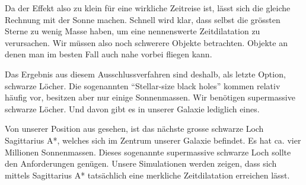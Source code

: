 \begin{refsection}
    Da der Effekt also zu klein für eine wirkliche Zeitreise ist, lässt sich die gleiche Rechnung mit der Sonne machen. Schnell wird klar, dass selbst die grössten Sterne zu wenig Masse haben, um eine nennenswerte Zeitdilatation zu verursachen. Wir müssen also noch schwerere Objekte betrachten. Objekte an denen man im besten Fall auch nahe vorbei fliegen kann. 
     
    Das Ergebnis aus diesem Ausschlussverfahren sind deshalb, als letzte Option, schwarze Löcher. Die sogenannten ``Stellar-size black holes'' kommen relativ häufig vor, besitzen aber nur einige Sonnenmassen. Wir benötigen supermassive schwarze Löcher. Und davon gibt es in unserer Galaxie lediglich eines.
    
     Von unserer Position aus gesehen, ist das nächste grosse schwarze Loch Sagittarius A*, welches sich im Zentrum unserer Galaxie befindet. Es hat ca. vier Millionen Sonnenmassen. Dieses sogenannte supermassive schwarze Loch sollte den Anforderungen genügen. Unsere Simulationen werden zeigen, dass sich mittels Sagittarius A* tatsächlich eine merkliche Zeitdilatation erreichen lässt.
    

\end{refsection}
